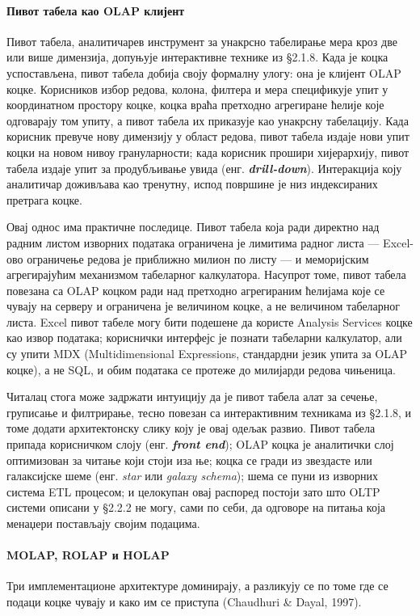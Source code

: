 \paragraph{Пивот табела као OLAP клијент}
Пивот табела, аналитичарев инструмент за унакрсно табелирање мера кроз две или више димензија, допуњује интерактивне технике из §2.1.8. Када је коцка успостављена, пивот табела добија своју формалну улогу: она је клијент OLAP коцке. Корисников избор редова, колона, филтера и мера спецификује упит у координатном простору коцке, коцка враћа претходно агрегиране ћелије које одговарају том упиту, а пивот табела их приказује као унакрсну табелацију. Када корисник превуче нову димензију у област редова, пивот табела издаје нови упит коцки на новом нивоу грануларности; када корисник прошири хијерархију, пивот табела издаје упит за продубљивање увида (енг. \textbf{\textit{drill-down}}). Интеракција коју аналитичар доживљава као тренутну, испод површине је низ индексираних претрага коцке.

Овај однос има практичне последице. Пивот табела која ради директно над радним листом изворних података ограничена је лимитима радног листа — Excel-ово ограничење редова је приближно милион по листу — и меморијским агрегирајућим механизмом табеларног калкулатора. Насупрот томе, пивот табела повезана са OLAP коцком ради над претходно агрегираним ћелијама које се чувају на серверу и ограничена је величином коцке, а не величином табеларног листа. Excel пивот табеле могу бити подешене да користе Analysis Services коцке као извор података; кориснички интерфејс је познати табеларни калкулатор, али су упити MDX (Multidimensional Expressions, стандардни језик упита за OLAP коцке), а не SQL, и обим података се протеже до милијарди редова чињеница.

Читалац стога може задржати интуицију да је пивот табела алат за сечење, груписање и филтрирање, тесно повезан са интерактивним техникама из §2.1.8, и томе додати архитектонску слику коју је овај одељак развио. Пивот табела припада корисничком слоју (енг. \textbf{\textit{front end}}); OLAP коцка је аналитички слој оптимизован за читање који стоји иза ње; коцка се гради из звездасте или галаксијске шеме (енг. \textit{star} или \textit{galaxy schema}); шема се пуни из изворних система ETL процесом; и целокупан овај распоред постоји зато што OLTP системи описани у §2.2.2 не могу, сами по себи, да одговоре на питања која менаџери постављају својим подацима.

\paragraph{MOLAP, ROLAP и HOLAP}
Три имплементационе архитектуре доминирају, а разликују се по томе где се подаци коцке чувају и како им се приступа (Chaudhuri \& Dayal, 1997).

